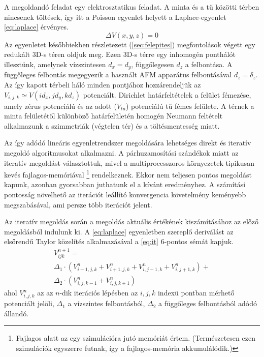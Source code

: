 	A megoldandó feladat egy elektrosztatikus feladat.
	A minta és a tű közötti térben nincsenek töltések, így itt a Poisson egyenlet helyett a
	Laplace-egyenlet \eqref{eq:laplace} érvényes.
	\begin{equation}\label{eq:laplace}
		\Delta V(x,y,z) = 0 
	\end{equation}
	Az egyenletet későbbiekben részletezett (\ref{sec:felepites}) megfontolások végett egy redukált
	3D-s téren oldjuk meg.
	Ezen 3D-s térre egy inhomogén ponthálót illesztünk, amelynek vízszintesen $d_x = d_y$,
	függőlegesen $d_z$ a felbontása. A függőleges felbontás megegyezik a használt AFM apparátus
	felbontásával $d_z = \delta_z$.
	Az így kapott térbeli háló minden pontjához hozzárendeljük az $V_{i,j,k} \simeq V(id_x,jd_y,kd_z)$
	potenciált.
	Dirichlet határfeltételek a felület fémezése, amely zérus potenciálú és az adott ($V_{tu}$)
	potenciálú  tű fémes felülete.
	A térnek a minta felületétől különböző határfelületén homogén Neumann feltételt alkalmazunk
	a szimmetriák (végtelen tér) és a töltésmentesség miatt.
	
	Az így adódó lineáris egyenletrendszer megoldására lehetséges direkt és iteratív megoldó
	algoritmusokat alkalmazni.
	A párhuzamosítási szándékok miatt az iteratív megoldást választottuk, mivel a multiprocesszoros
	környezetek tipikusan kevés fajlagos-memóriával \footnote{Fajlagos alatt az egy szimulációra jutó
	memóriát értem. (Természetesen ezen szimulációk egyszerre futnak, így a fajlagos-memória
	akkumulálódik.)} rendelkeznek.
	Ekkor nem teljesen pontos megoldást kapunk, azonban gyorsabban juthatunk el a kívánt eredményhez.
	A számítási pontosság növelhető az iterációt leállító konvergencia követelmény keményebb
	megszabásával, ami persze több iterációt jelent.
	
	Az iteratív megoldás során a megoldás aktuális értékének kiszámításához az előző megoldásból indulunk ki.
	A \eqref{eq:laplace} egyenletben szereplő deriválást az elsőrendű Taylor közelítés alkalmazásával a
	\eqref{eq:it} 6-pontos sémát kapjuk.
	\begin{multline} \label{eq:it} 
		V_{ijk}^{n+1} = \\ \Delta_1 \cdot \left(V_{i-1,j,k}^n+V_{i+1,j,k}^n
		+V_{i,j-1,k}^n+V_{i,j+1,k}^n\right)+ \\
						\Delta_2 \cdot \left(V_{i,j,k-1}^n+V_{i,j,k+1}^n\right)
	\end{multline}
	ahol $V_{i,j,k}^n$ az az $n$-dik iterációs lépésben az $i,j,k$ indexü
	pontban mérhető potenciált jelöli, $\Delta_1$ a vízszintes felbontásból,
	$\Delta_2$ a függőleges felbontásból adódó állandó.
	
